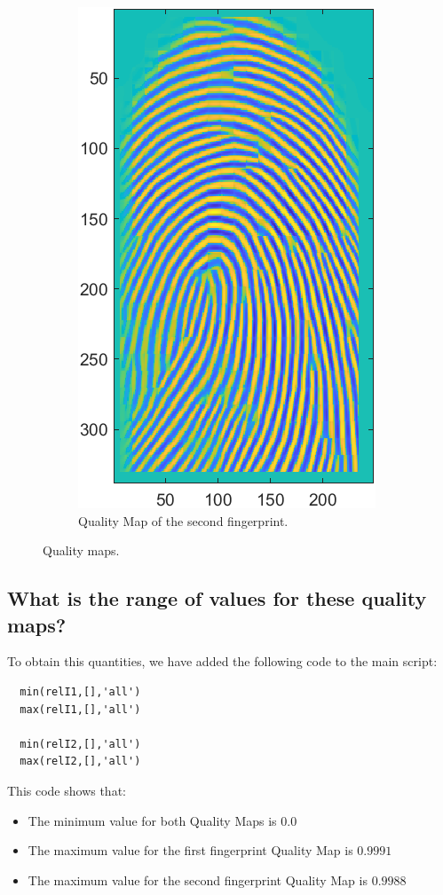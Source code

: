 \documentclass[a4paper]{article}
\begin{document}
\begin{figure}[H]
\begin{subfigure}[t]{0.45\textwidth}
         \includegraphics[scale=0.8]{Figures/Enhanced2}
         \caption{Quality Map of the second fingerprint.}
     \end{subfigure}
    \caption{Quality maps.}
    \label{fig:ex2a}
\end{figure}


\subsection{ What is the range of values for these quality maps?}

To obtain this quantities, we have added the following code to the main script: 

\begin{verbatim}
  min(relI1,[],'all')
  max(relI1,[],'all')
  
  min(relI2,[],'all')
  max(relI2,[],'all')
\end{verbatim}

This code shows that:

\begin{itemize}
  \item The minimum value for both Quality Maps is \(0.0\)
  \item The maximum value for the first fingerprint Quality Map is \(0.9991\)
  \item The maximum value for the second fingerprint Quality Map is \(0.9988\)
\end{itemize}
\end{document}
